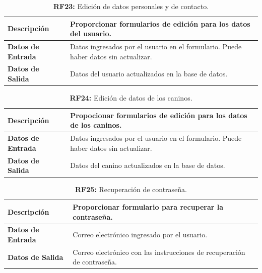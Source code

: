 \documentclass[a4paper, 12pt]{article}
\begin{document}
\begin{table}[H]
\captionsetup{list=no}%
\captionsetup{justification=raggedright,singlelinecheck=false}
\captionsetup{labelformat=empty}
\caption{\textbf{RF23:} Edición de datos personales y de contacto.}
\label{tab:RF23}
	\begin{tabular}{|m{5cm}|m{10cm}|}
	\hline
	\textbf{Descripción} & Proporcionar formularios de edición para los datos del usuario. \\ 
	\hline
	\textbf{Datos de Entrada} & Datos ingresados por el usuario en el formulario. Puede haber datos sin actualizar. \\ 
	\hline
	\textbf{Datos de Salida} &  Datos del usuario actualizados en la base de datos. \\ 
	\hline
\end{tabular}
\end{table}

\begin{table}[H]
\captionsetup{list=no}%
\captionsetup{justification=raggedright,singlelinecheck=false}
\captionsetup{labelformat=empty}
\caption{\textbf{RF24:} Edición de datos de los caninos.}
\label{tab:RF24}
	\begin{tabular}{|m{5cm}|m{10cm}|}
	\hline
	\textbf{Descripción} & Propocionar formularios de edición para los datos de los caninos. \\ 
	\hline
	\textbf{Datos de Entrada} &  Datos ingresados por el usuario en el formulario. Puede haber datos sin actualizar.  \\ 
	\hline
	\textbf{Datos de Salida} &   Datos del canino actualizados en la base de datos. \\ 
	\hline
\end{tabular}
\end{table}

\begin{table}[H]
\captionsetup{list=no}%
\captionsetup{justification=raggedright,singlelinecheck=false}
\captionsetup{labelformat=empty}
\caption{\textbf{RF25:} Recuperación de contraseña.}
\label{tab:RF25}
	\begin{tabular}{|m{5cm}|m{10cm}|}
	\hline
	\textbf{Descripción} & Proporcionar formulario para recuperar la contraseña. \\ 
	\hline
	\textbf{Datos de Entrada} & Correo electrónico ingresado por el usuario. \\ 
	\hline
	\textbf{Datos de Salida} & Correo electrónico con las instrucciones de recuperación de contraseña. \\ 
	\hline
\end{tabular}
\end{table}
\end{document}
